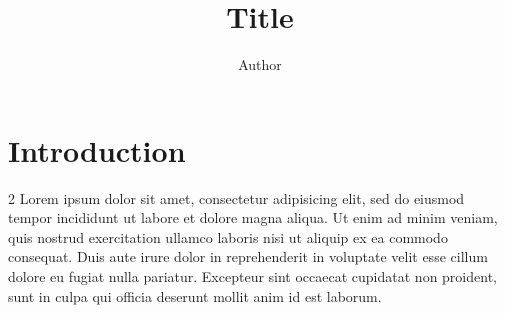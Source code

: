 \documentclass[kulak,landscape]{kulakposter}
\title{Title}
\institute{Institute}
\author{Author}
\begin{document}
\maketitle

\section*{Introduction}
\begin{multicols}{2}\setlength{\columnseprule}{0pt}
	Lorem ipsum dolor sit amet, consectetur adipisicing elit, sed do eiusmod tempor incididunt ut labore et dolore magna aliqua. Ut enim ad minim veniam, quis nostrud exercitation ullamco laboris nisi ut aliquip ex ea commodo consequat. Duis aute irure dolor in reprehenderit in voluptate velit esse cillum dolore eu fugiat nulla pariatur. Excepteur sint occaecat cupidatat non proident, sunt in culpa qui officia deserunt mollit anim id est laborum.
\end{multicols}
\end{document}
